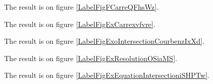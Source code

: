 \documentclass[a4paper,12pt]{article}
\begin{document}

The result is on figure \ref{LabelFigFCarreQFhsWz}.
\newcommand{\CaptionFigFCarreQFhsWz}{<+Type your caption here+>}


The result is on figure \ref{LabelFigExCarrexvfvre}.
\newcommand{\CaptionFigExCarrexvfvre}{<+Type your caption here+>}


The result is on figure \ref{LabelFigExoIntersectionCourbenzIxXd}.
\newcommand{\CaptionFigExoIntersectionCourbenzIxXd}{<+Type your caption here+>}



\clearpage


The result is on figure \ref{LabelFigExResolutionOSiaMS}.
\newcommand{\CaptionFigExResolutionOSiaMS}{<+Type your caption here+>}


The result is on figure \ref{LabelFigExEquationIntersectioniSHPTw}.
\newcommand{\CaptionFigExEquationIntersectioniSHPTw}{<+Type your caption here+>}

\end{document}
